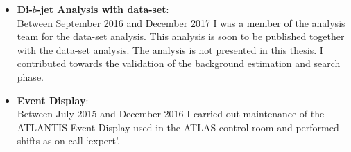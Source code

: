 \begin{itemize}[leftmargin=*]
\begin{itemize}
  \end{itemize}
  \vspace{1em}
\item\textbf{Di-$b$-jet Analysis  with \hm{} data-set}: \\
  Between September 2016 and December 2017 I was a member of the analysis team for the \hm{} data-set analysis.
  This analysis is soon to be published together with the \lm{} data-set analysis.
  The analysis is not presented in this thesis.
  I contributed towards the validation of the background estimation and search phase.\vspace{1em}
\item\textbf{Event Display}: \\
  Between July 2015 and December 2016 I carried out maintenance of the {\sc ATLANTIS} Event Display used in the ATLAS control room
  and performed shifts as on-call `expert'.
\end{itemize}
